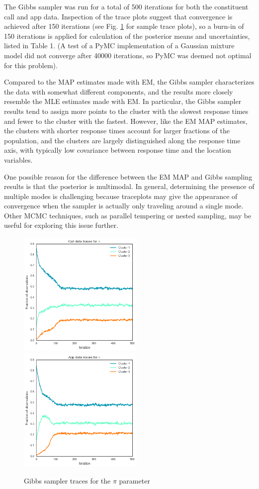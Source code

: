 \documentclass[twoside]{article}
\theoremstyle{theorem}
\theoremstyle{theorem}
\theoremstyle{theorem}
\theoremstyle{lemma}
\theoremstyle{definition}
\theoremstyle{example}
\begin{document}
The Gibbs sampler was run for a total of 500 iterations for both the constituent call and app data. Inspection of the trace plots suggest that convergence is achieved after 150 iterations (see Fig. \ref{trace} for sample trace plots), so a burn-in of 150 iterations is applied for calculation of the posterior means and uncertainties, listed in Table 1. (A test of a PyMC implementation of a Gaussian mixture model did not converge after 40000 iterations, so PyMC was deemed not optimal for this problem). 

Compared to the MAP estimates made with EM, the Gibbs sampler characterizes the data with somewhat different components, and the results more closely resemble the MLE estimates made with EM. In particular, the Gibbs sampler results tend to assign more points to the cluster with the slowest response times and fewer to the cluster with the fastest. However, like the EM MAP estimates, the clusters with shorter response times account for larger fractions of the population, and the clusters are largely distinguished along the response time axis, with typically low covariance between response time and the location variables. 

One possible reason for the difference between the EM MAP and Gibbs sampling results is that the posterior is multimodal. In general, determining the presence of multiple modes is challenging because traceplots may give the appearance of convergence when the sampler is actually only traveling around a single mode. Other MCMC techniques, such as parallel tempering or nested sampling, may be useful for exploring this issue further. 

\begin{figure}
\begin{center}
\includegraphics[width=60mm]{calldatapitrace}
\includegraphics[width=60mm]{appdatapitrace}
\caption{Gibbs sampler traces for the $\pi$ parameter}
\label{trace}
\end{center}
\end{figure}
\end{document}
